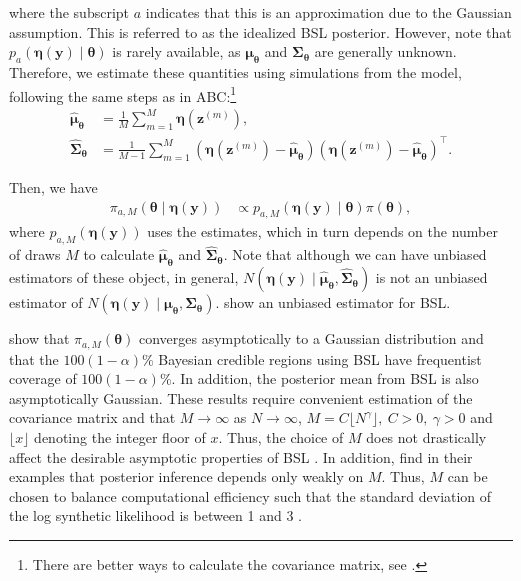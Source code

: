 where the subscript \( a \) indicates that this is an approximation due to the Gaussian assumption. This is referred to as the idealized BSL posterior. However, note that \( p_a(\boldsymbol{\eta}(\boldsymbol{y})\mid \boldsymbol{\theta}) \) is rarely available, as \( \boldsymbol{\mu}_{\boldsymbol{\theta}} \) and \( \boldsymbol{\Sigma}_{\boldsymbol{\theta}} \) are generally unknown. Therefore, we estimate these quantities using simulations from the model, following the same steps as in ABC:\footnote{There are better ways to calculate the covariance matrix, see \cite{nott2023bayesian}.}
\begin{align*} 
	\widehat{\boldsymbol{\mu}}_{\boldsymbol{\theta}} &= \frac{1}{M} \sum_{m=1}^{M} \boldsymbol{\eta}(\boldsymbol{z}^{(m)}),\\
	\widehat{\boldsymbol{\Sigma}}_{\boldsymbol{\theta}} &= \frac{1}{M-1} \sum_{m=1}^{M} (\boldsymbol{\eta}(\boldsymbol{z}^{(m)}) - \widehat{\boldsymbol{\mu}}_{\boldsymbol{\theta}})(\boldsymbol{\eta}(\boldsymbol{z}^{(m)}) - \widehat{\boldsymbol{\mu}}_{\boldsymbol{\theta}})^{\top}. 
\end{align*}

Then, we have 
\begin{align*} 
	\pi_{a,M}(\boldsymbol{\theta} \mid \boldsymbol{\eta}(\boldsymbol{y})) &\propto p_{a,M}(\boldsymbol{\eta}(\boldsymbol{y})\mid \boldsymbol{\theta}) \pi(\boldsymbol{\theta}), 
\end{align*}
where $p_{a,M}(\boldsymbol{\eta}(\boldsymbol{y}))$ uses the estimates, which in turn depends on the number of draws $M$ to calculate $\widehat{\boldsymbol{\mu}}_{\boldsymbol{\theta}}$ and $\widehat{\boldsymbol{\Sigma}}_{\boldsymbol{\theta}}$. Note that although we can have unbiased estimators of these object, in general, $N(\boldsymbol{\eta}(\boldsymbol{y})\mid \widehat{\boldsymbol{\mu}}_{\boldsymbol{\theta}},\widehat{\boldsymbol{\Sigma}}_{\boldsymbol{\theta}})$ is not an unbiased estimator of $N(\boldsymbol{\eta}(\boldsymbol{y})\mid {\boldsymbol{\mu}}_{\boldsymbol{\theta}},{\boldsymbol{\Sigma}}_{\boldsymbol{\theta}})$. \cite{an2022bsl} show an unbiased estimator for BSL. 

\cite{nott2023bayesian} show that \( \pi_{a,M}(\boldsymbol{\theta}) \) converges asymptotically to a Gaussian distribution and that the \( 100(1-\alpha)\% \) Bayesian credible regions using BSL have frequentist coverage of \( 100(1-\alpha)\% \). In addition, the posterior mean from BSL is also asymptotically Gaussian. These results require convenient estimation of the covariance matrix and that \( M \to \infty \) as \( N \to \infty \), $M=C\lfloor N^{\gamma} \rfloor, \ C>0, \ \gamma > 0$ and $\lfloor x \rfloor$ denoting the integer floor of $x$. Thus, the choice of \( M \) does not drastically affect the desirable asymptotic properties of BSL \cite{nott2023bayesian}. In addition, \cite{price2018bayesian} find in their examples that posterior inference depends only weakly on \( M \). Thus, \( M \) can be chosen to balance computational efficiency such that the standard deviation of the log synthetic likelihood is between 1 and 3 \cite{an2019accelerating}. 

